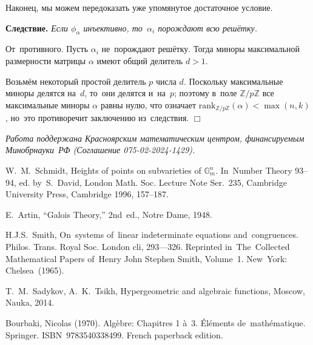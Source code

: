\documentclass[twoside]{article}
\begin{document}
Наконец, мы можем передоказать уже упомянутое достаточное условие.

\medskip\noindent\textbf{Следствие.}\emph{
    Если $\phi_\alpha$ инъективно, то~$\alpha_i$ порождают всю решётку.
}\medskip

    От~противного. Пусть $\alpha_i$ не~порождают решётку. Тогда миноры максимальной размерности
    матрицы $\alpha$ имеют общий делитель $d > 1$.

    Возьмём некоторый простой делитель $p$ числа $d$. Поскольку максимальные миноры
    делятся на~$d$, то~они делятся и~на~$p$; поэтому в~поле $\mathbb{Z} / p \mathbb{Z}$
    все максимальные миноры $\alpha$ равны нулю, что означает $\mathrm{rank}_{\mathbb{Z} / p \mathbb{Z}}(\alpha) < \max(n, k)$ \cite{Brbk70},
    но~это противоречит заключению из~следствия.
\hfill$\Box$



\medskip


\emph{ Работа поддержана Красноярским математическим центром,
финансируемым Минобрнауки РФ (Соглашение 075-02-2024-1429). }



\bigskip




\begin{thebibliography}{9}

\label{Schm94}
W.~M.~Schmidt, Heights of points on subvarieties of $\mathbb{G}^n_m$.
In~Number Theory 93–94, ed. by~S.~David, London Math. Soc. Lecture Note Ser.~235,
Cambridge University Press, Cambridge 1996, 157–187.

\label{Art48}
E.~Artin, “Galois Theory,” 2nd~ed., Notre Dame, 1948.

\label{Smith60}
H.J.S.~Smith, On~systems of~linear indeterminate equations and~congruences. Philos. Trans. Royal
Soc. London cli, 293—326. Reprinted in~The~Collected Mathematical Papers of~Henry John Stephen Smith,
Volume~1. New~York: Chelsea~(1965).

\label{TsikhSad14}
T.~M.~Sadykov, A.~K.~Tsikh, Hypergeometric and algebraic functions, Moscow, Nauka, 2014.

\label{Brbk70}
Bourbaki, Nicolas (1970). Alg\`ebre: Chapitres 1 \`a~3. \'El\'ements de~math\'ematique. Springer. ISBN~9783540338499. French paperback edition.


\end{thebibliography}



\makeEngTit   %
\end{document}
